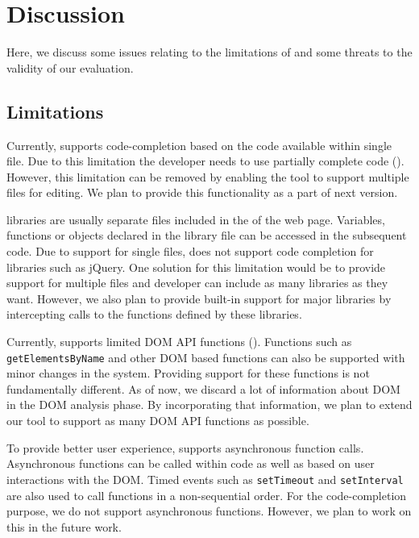 \section{Discussion}
\label{Sec:Discussion}
Here, we discuss some issues relating to the limitations of \dompletion and some threats to the validity of our evaluation.

	\subsection{Limitations}
	\label{Sec:Limitations}
	
	Currently, \dompletion supports code-completion based on the code available within single \javascript file. Due to this limitation the developer needs to use partially complete \javascript code (). However, this limitation can be removed by enabling the tool to support multiple files for editing. We plan to provide this functionality as a part of next version.
	
	\javascript libraries are usually separate \javascript files included in the \html of the web page. Variables, functions or objects declared in the library file can be accessed in the subsequent \javascript code. Due to support for single \javascript files, \dompletion does not support code completion for \javascript libraries such as jQuery. One solution for this limitation would be to provide support for multiple \javascript files and developer can include as many libraries as they want. However, we also plan to provide built-in support for major \javascript libraries by intercepting calls to the functions defined by these libraries.
	
	Currently, \dompletion supports limited DOM API functions (). Functions such as \texttt{getElementsByName} and other DOM based functions can also be supported with minor changes in the system. Providing support for these functions is not fundamentally different.  As of now, we discard a lot of information about DOM in the DOM analysis phase. By incorporating that information, we plan to extend our tool to support as many DOM API functions as possible.
	
	To provide better user experience, \javascript supports asynchronous function calls. Asynchronous functions can be called within \javascript code as well as based on user interactions with the DOM. Timed events such as \texttt{setTimeout} and \texttt{setInterval} are also used to call \javascript functions in a non-sequential order. For the code-completion purpose, we do not support asynchronous functions. However, we plan to work on this in the future work.
	
